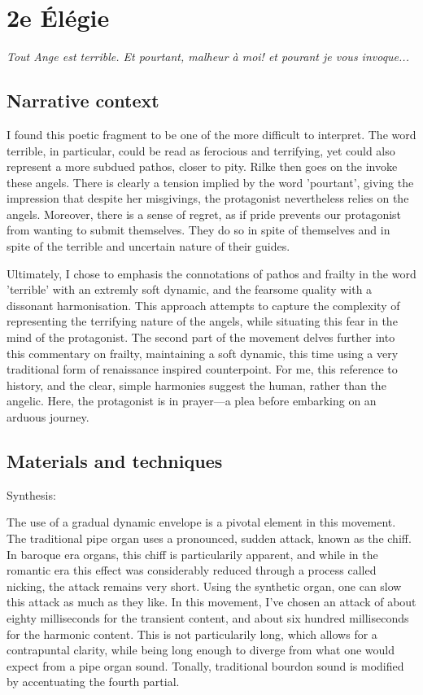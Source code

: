 \documentclass[12pt,twoside,maitrise]{dms_ks}
\theoremstyle{definition}
\begin{document}

\section{2e Élégie}

\epigraph{\textit{Tout Ange est terrible. Et pourtant, malheur à moi! et pourant je vous invoque...}}{}

\subsection{Narrative context}

I found this poetic fragment to be one of the more difficult to interpret. 
The word terrible, in particular, could be read as ferocious and terrifying, yet could also represent a more subdued pathos, closer to pity.
Rilke then goes on the invoke these angels.
There is clearly a tension implied by the word 'pourtant', giving the impression that despite her misgivings, the protagonist nevertheless relies on the angels.
Moreover, there is a sense of regret, as if pride prevents our protagonist from wanting to submit themselves.
They do so in spite of themselves and in spite of the terrible and uncertain nature of their guides.

Ultimately, I chose to emphasis the connotations of pathos and frailty in the word 'terrible' with an extremly soft dynamic, and the fearsome quality with a dissonant harmonisation.
This approach attempts to capture the complexity of representing the terrifying nature of the angels, while situating this fear in the mind of the protagonist.
The second part of the movement delves further into this commentary on frailty, maintaining a soft dynamic, this time using a very traditional form of renaissance inspired counterpoint.
For me, this reference to history, and the clear, simple harmonies suggest the human, rather than the angelic.
Here, the protagonist is in prayer---a plea before embarking on an arduous journey.

\subsection{Materials and techniques}

Synthesis:

The use of a gradual dynamic envelope is a pivotal element in this movement.
The traditional pipe organ uses a pronounced, sudden attack, known as the chiff.
In baroque era organs, this chiff is particularily apparent, and while in the romantic era this effect was considerably reduced through a process called nicking, the attack remains very short.
Using the synthetic organ, one can slow this attack as much as they like. 
In this movement, I've chosen an attack of about eighty milliseconds for the transient content, and about six hundred milliseconds for the harmonic content. This is not particularily long, which allows for a contrapuntal clarity, while being long enough to diverge from what one would expect from a pipe organ sound.
Tonally, traditional bourdon sound is modified by accentuating the fourth partial.
\end{document}

